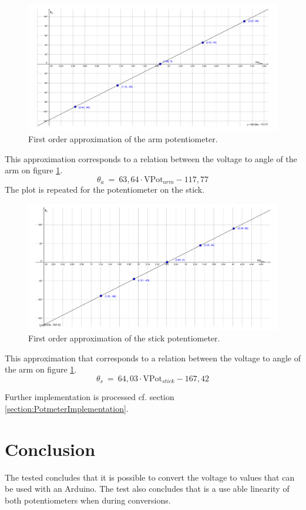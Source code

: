\begin{figure}[htbp]
\hspace*{-3cm}  
\centering
\includegraphics[width=0.95\paperwidth]{figures/appendix/PotentiometerPlot.pdf}
\caption{First order approximation of the arm potentiometer.}
\label{fig:PotentiometerPlot}
\end{figure}
\bigbreak

This approximation corresponds to a relation between the voltage to angle of the arm on figure \ref{fig:PotentiometerPlot}.
\begin{equation}
\theta_a\ =\ 63,64 \cdot \text{VPot}_{arm} - 117,77
\end{equation}
\newpage
The plot is repeated for the potentiometer on the stick.
\begin{figure}[htbp]  
\hspace*{-3cm}
\centering
\includegraphics[width=0.95\paperwidth]{figures/appendix/PotentiometerPlotStick.pdf}
\caption{First order approximation of the stick potentiometer.}
\label{fig:PotentiometerPlotStick}
\end{figure}

This approximation that corresponds to a relation between the voltage to angle of the arm on figure \ref{fig:PotentiometerPlot}.
\begin{equation}
\theta_s\ =\ 64,03 \cdot \text{VPot}_{stick} - 167,42
\end{equation}

Further implementation is processed cf. section \ref{section:PotmeterImplementation}.

\section*{Conclusion}
The tested concludes that it is possible to convert the voltage to values that can be used with an Arduino. The test also concludes that is a use able linearity of both potentiometers when during conversions.

